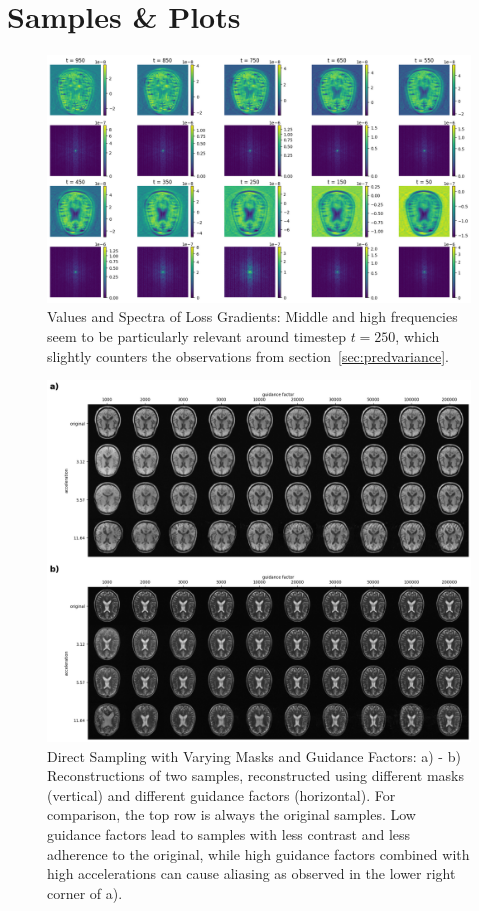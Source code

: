 \chapter{Samples \& Plots}
\begin{figure}
    \centering
    \includegraphics[width=.66\textwidth]{images/gradientspectra.png}
    \caption[Values and Spectra of Loss Gradients]{Values and Spectra of Loss Gradients: Middle and high frequencies seem to be particularly relevant around timestep $t=250$, which slightly counters the observations from section~\ref{sec:predvariance}.}
    \label{fig:lossgradients}
\end{figure}

\begin{figure}
    \centering
    \includegraphics[width=\textwidth]{images/directsampling_comparison.png}
    \caption[Direct Sampling with Varying Masks and Guidance Factors]{Direct Sampling with Varying Masks and Guidance Factors: a) - b) Reconstructions of two samples, reconstructed using different masks (vertical) and different guidance factors (horizontal). For comparison, the top row is always the original samples. Low guidance factors lead to samples with less contrast and less adherence to the original, while high guidance factors combined with high accelerations can cause aliasing as observed in the lower right corner of a).}
    \label{fig:directsamplingcomparison}
\end{figure}


